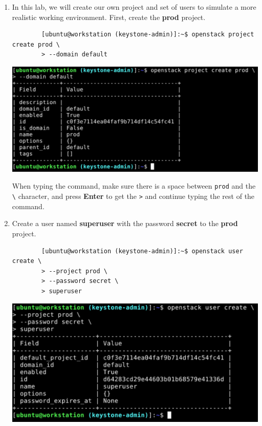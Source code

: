 \documentclass[letterpaper, 12pt]{article}
\begin{document}
\begin{enumerate}
    \item In this lab, we will create our own project and set of users to simulate a more realistic working environment.
    First, create the \textbf{prod} project.
    \begin{lstlisting}
        [ubuntu@workstation (keystone-admin)]:~$ openstack project create prod \
        > --domain default
    \end{lstlisting}

    \begin{center}
        \includegraphics[width=\linewidth]{images/part1/step4.png}
    \end{center}

    \begin{tipbox}
        When typing the command, make sure there is a space between \texttt{prod} and the \texttt{\textbackslash}
        character, and press \textbf{Enter} to get the \texttt{>} and continue typing the rest of the command.
    \end{tipbox}

    \item Create a user named \textbf{superuser} with the password \textbf{secret} to the \textbf{prod} project.
    \begin{lstlisting}
        [ubuntu@workstation (keystone-admin)]:~$ openstack user create \
        > --project prod \
        > --password secret \
        > superuser
    \end{lstlisting}

    \begin{center}
        \includegraphics[width=\linewidth]{images/part1/step5.png}
    \end{center}


\end{enumerate}
\end{document}

